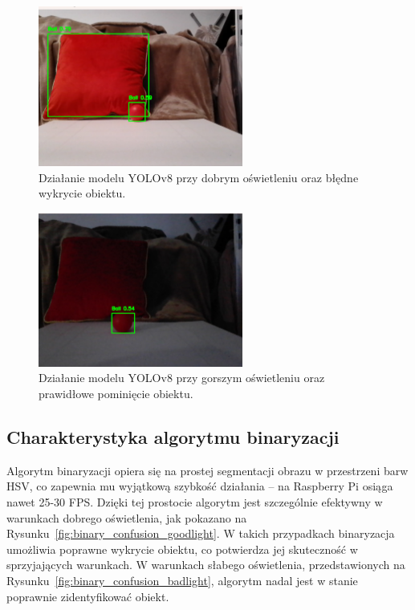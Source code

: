 \documentclass[a4paper,twoside,12pt]{book}
\begin{document}
\begin{figure}[h]
    \centering
    \includegraphics[width=0.6\textwidth]{Images/Porownanie/Yolo 8 laptop/Zrzut ekranu 2025-01-02 194808.png}
    \caption{Działanie modelu YOLOv8 przy dobrym oświetleniu oraz błędne wykrycie obiektu.}
    \label{fig:yolov8_good_light_bad_object}
\end{figure}

\begin{figure}[h]
    \centering
    \includegraphics[width=0.6\textwidth]{Images/Porownanie/Yolo 8 laptop/Zrzut ekranu 2025-01-02 194704.png}
    \caption{Działanie modelu YOLOv8 przy gorszym oświetleniu oraz prawidłowe pominięcie obiektu.}
    \label{fig:yolov8_good_light_good_object}
\end{figure}

\newpage
\subsection{Charakterystyka algorytmu binaryzacji}

Algorytm binaryzacji opiera się na prostej segmentacji obrazu w przestrzeni barw HSV, co zapewnia mu wyjątkową szybkość działania – na Raspberry Pi osiąga nawet 25-30 FPS. Dzięki tej prostocie algorytm jest szczególnie efektywny w warunkach dobrego oświetlenia, jak pokazano na Rysunku~\ref{fig:binary_confusion_goodlight}. W takich przypadkach binaryzacja umożliwia poprawne wykrycie obiektu, co potwierdza jej skuteczność w sprzyjających warunkach.
W warunkach słabego oświetlenia, przedstawionych na Rysunku~\ref{fig:binary_confusion_badlight}, algorytm nadal jest w stanie poprawnie zidentyfikować obiekt. 
\end{document}

